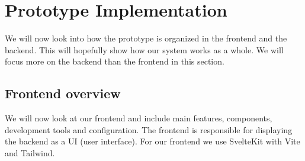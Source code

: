 \section{Prototype Implementation}
\label{sec:implementation}

We will now look into how the prototype is organized in the frontend and the backend.  This will hopefully show how our system works as a whole. We will focus more on the backend than the frontend in this section. 

\subsection{Frontend overview}
\noindent We will now look at our frontend and include main features, components, development tools and configuration. The frontend is responsible for displaying the backend as a UI (user interface). For our frontend we use SvelteKit with Vite and Tailwind.

